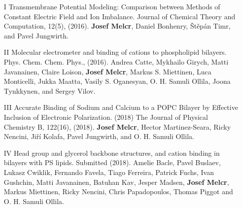 \documentclass[12pt,a4paper,twoside,openright]{report}
\let\openright=\cleardoublepage
\begin{document}





\begin{itemize}
\item[I] 
Transmembrane Potential Modeling: Comparison between Methods of Constant Electric
Field and Ion Imbalance. 
Journal of Chemical Theory and Computation, 12(5), (2016). 
\textbf{Josef Melcr}, Daniel Bonhenry, Štěpán Timr, and Pavel Jungwirth. 

\item[II] 
Molecular electrometer and binding of cations to phospholipid bilayers. 
Phys. Chem. Chem. Phys., (2016).
Andrea Catte, Mykhailo Girych, Matti Javanainen, Claire Loison, \textbf{Josef Melcr},
Markus S. Miettinen, Luca Monticelli, Jukka Maatta, Vasily S. Oganesyan,
O. H. Samuli Ollila, Joona Tynkkynen, and Sergey Vilov. 

\item[III]
Accurate Binding of Sodium and Calcium to a POPC Bilayer by Effective Inclusion of Electronic Polarization. (2018)
The Journal of Physical Chemistry B, 122(16), (2018).
\textbf{Josef Melcr}, Hector Martinez-Seara, Ricky Nencini, Jiří Kolafa, Pavel Jungwirth,
and O. H. Samuli Ollila. 

\item[IV]
Head group and glycerol backbone structures,
and cation binding in bilayers with PS lipids. Submitted (2018).
Amelie Bacle, Pavel Buslaev, Lukasz Cwiklik, Fernando Favela, Tiago Ferreira,
Patrick Fuchs, Ivan Gushchin, Matti Javanainen, Batuhan Kav, Jesper Madsen, 
\textbf{Josef Melcr}, Markus Miettinen, Ricky Nencini,  Chris Papadopoulos, Thomas Piggot 
and O. H. Samuli Ollila. 

\end{itemize}

\appendix

\openright
\end{document}
